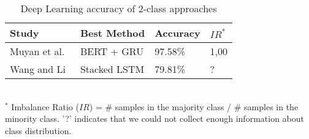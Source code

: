 \begin{table}[ht]
    \caption{Deep Learning accuracy of 2-class approaches}
    \label{tab:DL_performance_2class}
    \centering
    \begin{tabular}{l l l l}
        \toprule
        \textbf{Study} & \textbf{Best Method} & \textbf{Accuracy} & \textbf{$IR^*$}\\ 
        \midrule
        Muyan et al.~\cite{Li2022_lr2019} & BERT + GRU & 97.58\% & 1,00 \\
        Wang and Li~\cite{Wang2020_lr26} &  Stacked LSTM & 79.81\% & ? \\
        \bottomrule
    \end{tabular}
    \\ \vspace{0.1cm}
    \footnotesize
    $^*$ Imbalance Ratio ($IR$) = \# samples in the majority class / \# samples in the minority class. '?' indicates that we could not collect enough information about class distribution.
\end{table}